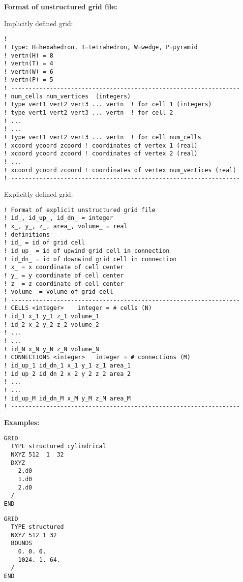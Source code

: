 \begin{mdframed}

\noindent
{\bf Format of unstructured grid file:}

Implicitly defined grid:
\begin{verbatim}
! 
! type: H=hexahedron, T=tetrahedron, W=wedge, P=pyramid
! vertn(H) = 8
! vertn(T) = 4
! vertn(W) = 6
! vertn(P) = 5
! -----------------------------------------------------------------
! num_cells num_vertices  (integers)
! type vert1 vert2 vert3 ... vertn  ! for cell 1 (integers)
! type vert1 vert2 vert3 ... vertn  ! for cell 2
! ...
! ...
! type vert1 vert2 vert3 ... vertn  ! for cell num_cells
! xcoord ycoord zcoord ! coordinates of vertex 1 (real)
! xcoord ycoord zcoord ! coordinates of vertex 2 (real)
! ...
! xcoord ycoord zcoord ! coordinates of vertex num_vertices (real)
! -----------------------------------------------------------------
\end{verbatim}
\end{mdframed}

\begin{mdframed}

Explicitly defined grid:
  
\begin{verbatim}
! Format of explicit unstructured grid file
! id_, id_up_, id_dn_ = integer
! x_, y_, z_, area_, volume_ = real
! definitions
! id_ = id of grid cell
! id_up_ = id of upwind grid cell in connection
! id_dn_ = id of downwind grid cell in connection
! x_ = x coordinate of cell center
! y_ = y coordinate of cell center
! z_ = z coordinate of cell center
! volume_ = volume of grid cell
! -----------------------------------------------------------------
! CELLS <integer>    integer = # cells (N)
! id_1 x_1 y_1 z_1 volume_1
! id_2 x_2 y_2 z_2 volume_2
! ...
! ...
! id_N x_N y_N z_N volume_N
! CONNECTIONS <integer>   integer = # connections (M)
! id_up_1 id_dn_1 x_1 y_1 z_1 area_1
! id_up_2 id_dn_2 x_2 y_2 z_2 area_2
! ...
! ...
! id_up_M id_dn_M x_M y_M z_M area_M
! -----------------------------------------------------------------
\end{verbatim}
\end{mdframed}

\begin{mdframed}

\noindent
{\bf Examples:}
\begin{verbatim}
GRID
  TYPE structured cylindrical
  NXYZ 512  1  32
  DXYZ
    2.d0
    1.d0
    2.d0
  /
END
\end{verbatim}

\begin{verbatim}
GRID
  TYPE structured
  NXYZ 512 1 32
  BOUNDS
    0. 0. 0.
    1024. 1. 64.
  /
END
\end{verbatim}
\end{mdframed}

